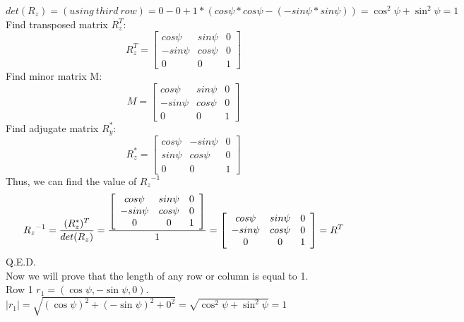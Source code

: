 \documentclass[a4paper, twoside, english]{article}
\begin{document}
${det(R_z)=(using\ third\ row)=0-0+1*(cos \psi * cos \psi - (-sin \psi * sin \psi)) = \cos^2 \psi + \sin^2 \psi = 1}$\\
Find transposed matrix $R_z^T$:
\begin{equation*}
	{R_z^T} = \left[
	\begin{array}{ccc}
		cos \psi  & sin \psi & 0  \\
		-sin \psi  & cos \psi & 0 \\
		0 & 0 & 1
	\end{array}
	\right]
	\label{eq:kmatrixZT}
\end{equation*}
Find minor matrix M:
\begin{equation*}
	M=\left[
	\begin{array}{ccc}
		cos \psi  & sin \psi & 0  \\
		-sin \psi  & cos \psi & 0 \\
		0 & 0 & 1
	\end{array}
	\right]
\end{equation*}
Find adjugate matrix $R_y^{*}$:
\begin{equation*}
	R_z^{*}=\left[
	\begin{array}{ccc}
		cos \psi  & -sin \psi & 0  \\
		sin \psi  & cos \psi & 0 \\
		0 & 0 & 1
	\end{array}
	\right]
\end{equation*}
Thus, we can find the value of ${{R_z}^{-1}}$
\begin{equation*}
{R_z}^{-1}={{(R_z^*)^T}\over{det(R_z)}}= {{\left[
		\begin{array}{ccc}
			cos \psi  & sin \psi & 0  \\
			-sin \psi  & cos \psi & 0 \\
			0 & 0 & 1
		\end{array}
		\right]}\over {1}} =  {\left[
	\begin{array}{ccc}
	cos \psi  & sin \psi & 0  \\
	-sin \psi  & cos \psi & 0 \\
	0 & 0 & 1
\end{array}
\right]} = R^T
\end{equation*} Q.E.D.\\
Now we will prove that the length of any row or column is equal to 1.\\
{Row 1 $r_1=(\cos \psi, -\sin \psi, 0)$. ${{|r_1|}={\sqrt{(\cos\psi)^2+(-\sin \psi)^2+0^2}}={\sqrt{ \cos^2 \psi + \sin^2 \psi}}=1}$}\\
\end{document}
